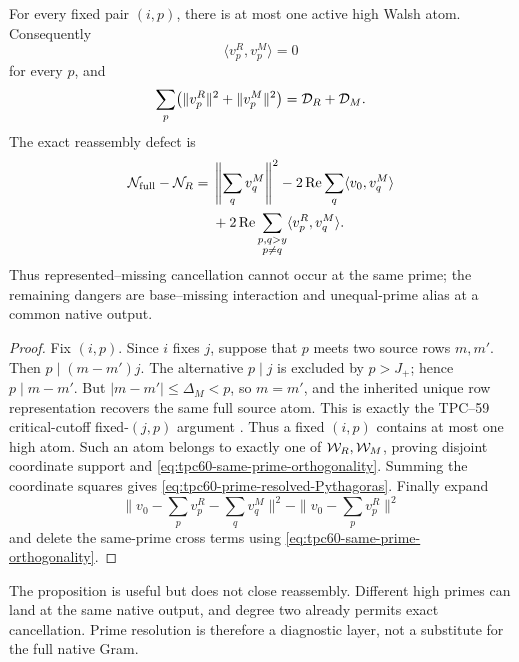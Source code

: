 \begin{proposition}
\label{prop:tpc60-same-prime-separation}
For every fixed pair \((i,p)\), there is at most one active high Walsh atom.
Consequently
\begin{equation}
 \langle v_p^R,v_p^M\rangle=0
 \label{eq:tpc60-same-prime-orthogonality}
\end{equation}
for every \(p\), and
\begin{equation}
 \sum_p\bigl(\|v_p^R\|^2+\|v_p^M\|^2\bigr)
 =\mathcal D_R+\mathcal D_M.
 \label{eq:tpc60-prime-resolved-Pythagoras}
\end{equation}
The exact reassembly defect is
\begin{align}
 \mathcal N_{\rm full}-\mathcal N_R
 ={}&\left\|\sum_qv_q^M\right\|^2
 -2\operatorname{Re}\sum_q\langle v_0,v_q^M\rangle
 \notag\\
 &+2\operatorname{Re}
   \sum_{\substack{p,q>y\\p\ne q}}
       \langle v_p^R,v_q^M\rangle.
 \label{eq:tpc60-exact-prime-alias-defect}
\end{align}
Thus represented--missing cancellation cannot occur at the same prime;
the remaining dangers are base--missing interaction and unequal-prime
alias at a common native output.
\end{proposition}

\begin{proof}
Fix \((i,p)\).  Since \(i\) fixes \(j\), suppose that \(p\) meets two
source rows \(m,m'\).  Then \(p\mid(m-m')j\).  The alternative \(p\mid j\)
is excluded by \(p>J_+\); hence \(p\mid m-m'\).  But
\(|m-m'|\le\Delta_M<p\), so \(m=m'\), and the inherited unique row
representation recovers the same full source atom.  This is exactly the
TPC--59 critical-cutoff fixed-\((j,p)\) argument
\citep{WangTPC59}.  Thus a fixed \((i,p)\) contains at most one high atom.
Such an atom belongs to exactly one of
\(\mathcal W_R,\mathcal W_M\), proving disjoint coordinate support and
\eqref{eq:tpc60-same-prime-orthogonality}.  Summing the coordinate squares
gives \eqref{eq:tpc60-prime-resolved-Pythagoras}.  Finally expand
\[
 \|v_0-\sum_pv_p^R-\sum_qv_q^M\|^2
 -\|v_0-\sum_pv_p^R\|^2
\]
and delete the same-prime cross terms using
\eqref{eq:tpc60-same-prime-orthogonality}.
\end{proof}

The proposition is useful but does not close reassembly.  Different high
primes can land at the same native output, and degree two already permits
exact cancellation.  Prime resolution is therefore a diagnostic layer,
not a substitute for the full native Gram.

